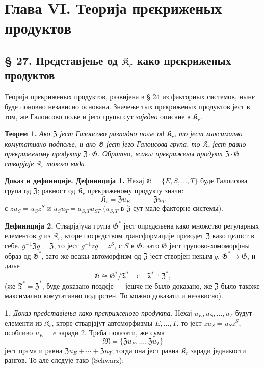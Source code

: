 \documentclass[11pt]{article}
\newcommand{\foreign}[1]{#1}
\begin{document}
\section*{Глава VI. Теорија прєкриженых продуктов}\label{kapitel-vi.-theorie-der-verschraenkten-produkte}

\subsection*{§ 27. Прєдставјење од \(\mathfrak K_r\) како прєкриженых продуктов}

Теорија прєкриженых продуктов, развијена в § 24 из факторных системов, нынє буде поновно независно основана. Значење тых прєкриженых продуктов јест в том, же Галоисово поље и јего групы сут \emph{заједно} описане в \(\mathfrak K_r\).

\noindent\textbf{Теорем 1.} \emph{Ако \(\mathfrak Z\) јест Галоисово разпадно поље од \(\mathfrak K_r\), то јест максимално комутативно подпоље, и ако \(\mathfrak G\) јест јего Галоисова група, то \(\mathfrak K_r\) јест равно прєкриженому продукту \(\mathfrak Z\cdot\mathfrak G\). Обратно, всакы прєкрижены продукт \(\mathfrak Z\cdot\mathfrak G\) стварјаје \(\mathfrak K_r\) такого вида.}

\noindent\textbf{Доказ и дефиниције. Дефиниција 1.} Нехај \(\mathfrak G=\{E,S,\ldots,T\}\) буде Галоисова група од \(\mathfrak Z\); равност од \(\mathfrak K_r\) прєкриженому продукту значи:
\[
\mathfrak K_r=\mathfrak Zu_E+\cdots+\mathfrak Zu_T
\]
с \(zu_S=u_Sz^S\) и \(u_Su_T=a_{S,T}u_{ST}\) (\(a_{S,T}\) в \(\mathfrak Z\) сут мале факторне системы).

\noindent\textbf{Дефиниција 2.} Стварјајуча група \(\mathfrak G^*\) јест опрєдєљена како множство регуларных елементов \(g\) из \(\mathfrak K_r\), кторе посрєдством трансформације прєводет \(\mathfrak Z\) како цєлост в себе. \(g^{-1}\mathfrak Zg=\mathfrak Z\), то јест \(g^{-1}zg=z^S\), с \(S\) в \(\mathfrak G\). зато \(\mathfrak G\) јест групово-хомоморфны образ од \(\mathfrak G^*\), зато же всакы автоморфизм од \(\mathfrak Z\) јест створјен некым \(g\), \(\mathfrak G^*\to\mathfrak G\), и даље
\[
\mathfrak G\cong\mathfrak G^*/\mathfrak T^*
\quad\text{с}\quad
\mathfrak T^*\supseteqq\mathfrak Z^*,
\]
(же \(\mathfrak T^*=\mathfrak Z^*\), буде доказано поздєје --- јешче не было доказано, же \(\mathfrak Z\) было такоже максимално комутативно подпрстен. То можно доказати и независно).

\noindent\textbf{1.} \emph{Доказ прєдставјења како прєкриженого продукта.} Нехај \(u_E,u_S,\ldots,u_T\) будут елементи из \(\mathfrak K_r\), кторе стварјајут автоморфизмы \(E,\ldots,T\), то јест \(zu_S=u_Sz^S\), особливо \(u_E=e\) заради 2. Трєба показати, же сума
\[
\mathfrak M=\{\mathfrak Zu_E,\ldots,\mathfrak Zu_T\}
\]
јест прєма и равна \(\mathfrak Zu_E+\cdots+\mathfrak Zu_T\); тогда она јест равна \(\mathfrak K_r\) заради једнакости рангов. То але слєдује тако (\foreign{Schwarz}):
\end{document}
